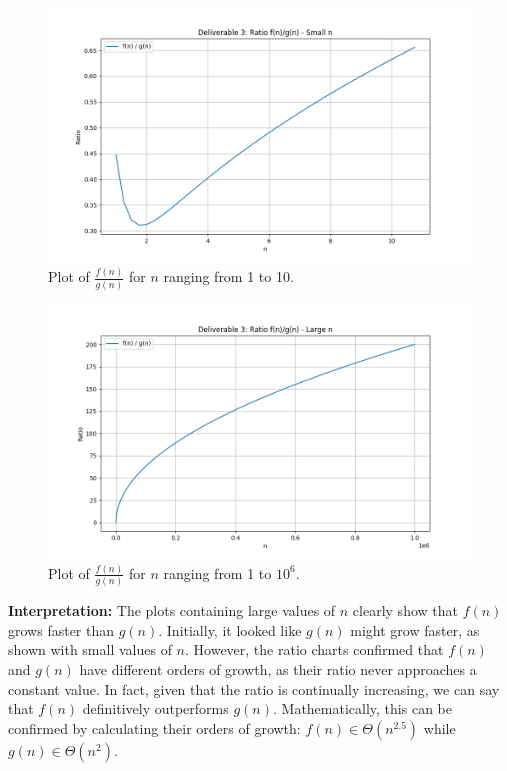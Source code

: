 \documentclass{article}
\begin{document}
\begin{figure}[H]
    \centering
    \includegraphics[width=\textwidth]{plot_deliverable3_ratio_smalln.png}
    \caption{Plot of $\frac{f(n)}{g(n)}$ for $n$ ranging from 1 to 10.}
    \label{fig:ratio_fn2_gn2_1_10}
\end{figure}

\begin{figure}[H]
    \centering
    \includegraphics[width=\textwidth]{plot_deliverable3_ratio_largen.png}
    \caption{Plot of $\frac{f(n)}{g(n)}$ for $n$ ranging from 1 to $10^6$.}
    \label{fig:ratio_fn2_gn2_1_10e6}
\end{figure}

\textbf{Interpretation:} The plots containing large values of $n$ clearly show that $f(n)$ grows faster than $g(n)$. Initially, it looked like $g(n)$ might grow faster, as shown with small values of $n$. However, the ratio charts confirmed that $f(n)$ and $g(n)$ have different orders of growth, as their ratio never approaches a constant value. In fact, given that the ratio is continually increasing, we can say that $f(n)$ definitively outperforms $g(n)$. Mathematically, this can be confirmed by calculating their orders of growth: $f(n) \in \Theta(n^{2.5})$ while $g(n) \in \Theta(n^2)$. 
\end{document}
